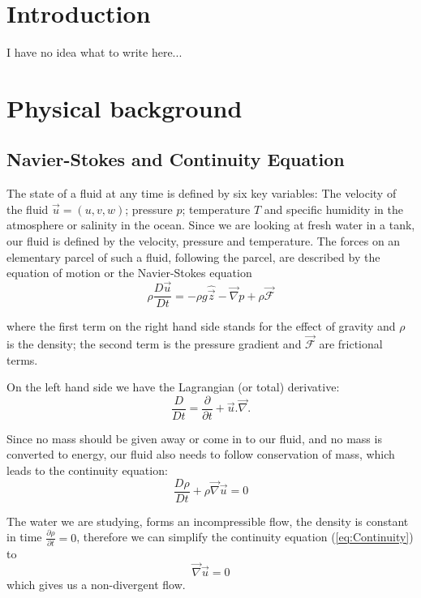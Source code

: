 \documentclass[12pt, a4paper, twoside]{article}
\begin{document}
\section{Introduction}
I have no idea what to write here...

\newpage

\section{Physical background}

	\subsection{Navier-Stokes and Continuity Equation}
		
		
		The state of a fluid at any time is defined by six key variables:
		The velocity of the fluid $\vec{u}=(u,v,w)$; pressure $p$; temperature $T$ and specific humidity in the atmosphere or salinity in the ocean. Since we are looking at fresh water in a tank, our fluid is defined by the velocity, pressure and temperature. The forces on an elementary parcel of such a fluid, following the parcel, are described by the equation of motion	or the Navier-Stokes equation
		\begin{equation}
			\rho \frac{D\vec{u}}{Dt} = -\rho g \hat{\vec{z}} - \vec{\nabla} p + \rho \vec{\mathcal{F}}
			\label{eq:Simple NSG}
		\end{equation} 
		
		where the first term on the right hand side stands for the effect of gravity and $\rho$ is the density; the second term is the pressure gradient and $\vec{\mathcal{F}}$ are frictional terms.
		
		On the left hand side we have the Lagrangian (or total) derivative:
		\begin{equation}
			\frac{D}{Dt} = \frac{\partial}{\partial t} + \vec{u}.\vec{\nabla}.
			\label{eq:Lag Dev}
		\end{equation} 
		
		
		Since no mass should be given away or come in to our fluid, and no mass is converted to energy, our fluid also needs to follow conservation of mass, which leads to the continuity equation:
		\begin{equation}
			\frac{D\rho}{Dt} + \rho \vec{\nabla} \vec{u} = 0
			\label{eq:Continuity}
		\end{equation}
		
		The water we are studying, forms an incompressible flow, the density is constant in time %
		 $\frac{\partial\rho}{\partial t} =0 $, therefore we can simplify the continuity equation (\ref{eq:Continuity}) to
		\begin{equation}
			\vec{\nabla} \vec{u} = 0
			\label{eq:nondivergence}
		\end{equation}
		which gives us a non-divergent flow.
		
\end{document}
